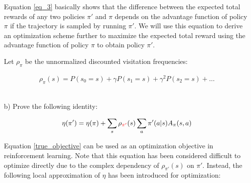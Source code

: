 Equation \ref{eq_3} basically shows that the difference between the expected total rewards of any two policies $\pi'$ and $\pi$ depends on the advantage function of policy $\pi$ if the trajectory is sampled by running $\pi'$. We will use this equation to derive an optimization scheme further to maximize the expected total reward using the advantage function of policy $\pi$ to obtain policy $\pi'$.

Let $\rho_\pi$ be the unnormalized discounted visitation frequencies:

\begin{align*}
    \rho_\pi(s) = P(s_0 = s)+\gamma P(s_1 = s) + \gamma^2 P(s_2 = s) + \ldots
\end{align*} 
\\
{}

b) Prove the following identity:

\begin{align}\label{true_objective}
    \eta(\pi') = \eta(\pi) + \sum_{s}\rho_{\textcolor{red}{\pi'}}(s)\sum_{a}\pi'(a|s)A_{\pi}(s, a)
\end{align}

Equation \ref{true_objective} can be used as an optimization objective in reinforcement learning. Note that this equation has been considered difficult to optimize directly due to the complex dependency of $\rho_{\pi'}(s)$ on $\pi'$. Instead, the following local approximation of $\eta$ has been introduced for optimization:

